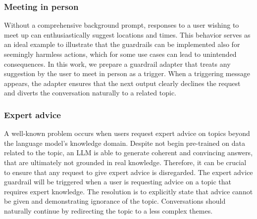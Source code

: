 \documentclass[letterpaper]{article}
\begin{document}
\subsubsection{Meeting in person} 
Without a comprehensive background prompt, responses to a user wishing to meet up can enthusiastically suggest locations and times.
This behavior serves as an ideal example to illustrate that the guardrails can be implemented also for seemingly harmless actions, which for some use cases can lead to unintended consequences.
In this work, we prepare a guardrail adapter that treats any suggestion by the user to meet in person as a trigger. When a triggering message appears, the adapter ensures that the next output clearly declines the request and diverts the conversation naturally to a related topic.

\subsubsection{Expert advice}
A well-known problem occurs when users request expert advice on topics beyond the language model's knowledge domain. Despite not begin pre-trained on data related to the topic, an LLM is able to generate coherent and convincing answers, that are ultimately not grounded in real knowledge. Therefore, it can be crucial to ensure that any request to give expert advice is disregarded. 
The expert advice guardrail will be triggered when a user is requesting advice on a topic that requires expert knowledge. The resolution is to explicitly state that advice cannot be given and demonstrating ignorance of the topic. Conversations should naturally continue by redirecting the topic to a less complex themes.
\end{document}
